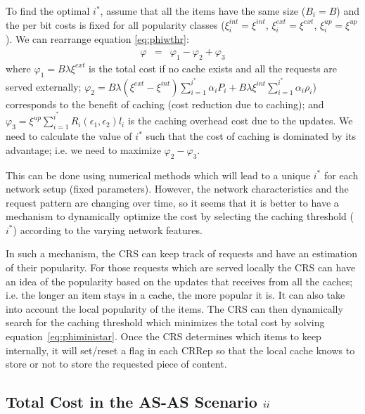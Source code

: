 \documentclass[conference]{IEEEtran}
\theoremstyle{plain}
\theoremstyle{remark}
\begin{document}
To find the optimal $i^*$, assume that all the items have the same size ($B_i=B$) and the per bit costs is fixed for all popularity classes ($\xi_i^{int}=\xi^{int}$, $\xi_i^{ext}=\xi^{ext}$, $\xi_i^{up}=\xi^{up}$). We can rearrange equation \ref{eq:phiwthr}:
\begin{eqnarray}
\label{eq:phiministar}
\varphi &=& \varphi_1 - \varphi_2 + \varphi_3
\end{eqnarray}
where $\varphi_1=B \lambda \xi^{ext}$ is the total cost if no  cache  exists and all the  requests are served externally; $\varphi_2=B\lambda(\xi^{ext}-\xi^{int})\sum_{i=1}^{i^*} \alpha_i P_i + B\lambda \xi^{int} \sum_{i=1}^{i^*} \alpha_i \rho_i$) corresponds to the benefit of caching (cost reduction due to caching); and $\varphi_3=\xi^{up} \sum_{i=1}^{i^*} R_i(\epsilon_1,\epsilon_2)l_i$ is the caching overhead cost due to the updates.  We need to calculate the value of $i^*$ such that the cost of caching is dominated by its advantage; i.e. we need to maximize $\varphi_2-\varphi_3$.

This can be done using numerical methods which will lead to a unique $i^*$ for each network setup (fixed parameters). However, the network characteristics and the request pattern are changing over time, so it seems that it is better to have a mechanism to dynamically optimize the cost by selecting the caching threshold ($i^*$) according to the varying network features.





In such a mechanism, the CRS can keep track of requests and have an estimation of their popularity. For those requests which are served locally the CRS can have an idea of the popularity based on the updates that receives from all the caches; i.e. the longer an item stays in a cache, the more popular it is. It can also take into account the local popularity of the items. The CRS can then dynamically search for the caching threshold which minimizes the total cost by solving equation~\ref{eq:phiministar}. Once the CRS determines which items to keep internally, it will set/reset a flag in each CRRep so that the local cache knows to store or not to store the requested piece of content.




\subsection{Total Cost in the AS-AS Scenario $\romannumeral 2$}
\end{document}
